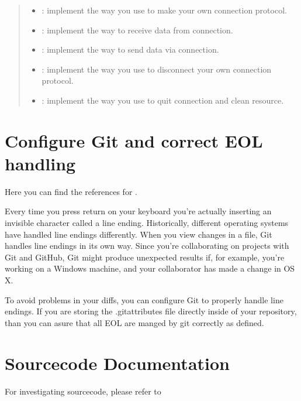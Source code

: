 \documentclass[letterpaper,10pt,english]{sphinxmanual}
\begin{document}
\begin{quote}
\begin{itemize}
\end{itemize}
\begin{itemize}
\item {} 
\sphinxAtStartPar
{}: implement the way you use to make your own connection protocol.

\item {} 
\sphinxAtStartPar
{}: implement the way to receive data from connection.

\item {} 
\sphinxAtStartPar
{}: implement the way to send data via connection.

\item {} 
\sphinxAtStartPar
{}: implement the way you use to disconnect your own connection protocol.

\item {} 
\sphinxAtStartPar
{}: implement the way you use to quit connection and clean resource.

\end{itemize}
\end{quote}


\chapter{Configure Git and correct EOL handling}
\label{\detokenize{index:configure-git-and-correct-eol-handling}}
\sphinxAtStartPar
Here you can find the references for .

\sphinxAtStartPar
Every time you press return on your keyboard you’re actually inserting
an invisible character called a line ending. Historically, different
operating systems have handled line endings differently. When you view
changes in a file, Git handles line endings in its own way. Since you’re
collaborating on projects with Git and GitHub, Git might produce
unexpected results if, for example, you’re working on a Windows machine,
and your collaborator has made a change in OS X.

\sphinxAtStartPar
To avoid problems in your diffs, you can configure Git to properly
handle line endings. If you are storing the .gitattributes file directly
inside of your repository, than you can asure that all EOL are manged by
git correctly as defined.


\chapter{Sourcecode Documentation}
\label{\detokenize{index:sourcecode-documentation}}
\sphinxAtStartPar
For investigating sourcecode, please refer to 
\end{document}
